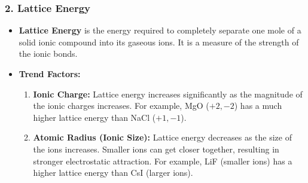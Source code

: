 \documentclass{article}
\begin{document}
\subsubsection*{2. Lattice Energy}
\begin{itemize}[itemsep=5pt]
    \item \textbf{Lattice Energy} is the energy required to completely separate one mole of a solid ionic compound into its gaseous ions. It is a measure of the strength of the ionic bonds.
    \item \textbf{Trend Factors:}
    \begin{enumerate}
        \item \textbf{Ionic Charge:} Lattice energy increases significantly as the magnitude of the ionic charges increases. For example, MgO ($+2, -2$) has a much higher lattice energy than NaCl ($+1, -1$).
        \item \textbf{Atomic Radius (Ionic Size):} Lattice energy decreases as the size of the ions increases. Smaller ions can get closer together, resulting in stronger electrostatic attraction. For example, LiF (smaller ions) has a higher lattice energy than CsI (larger ions).
    \end{enumerate}
\end{itemize}
\end{document}
